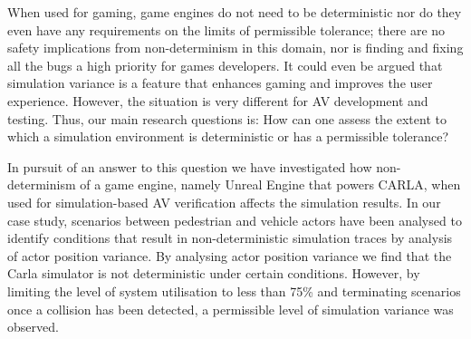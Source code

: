 \documentclass[letterpaper, 10 pt, journal, twoside]{IEEEtran}
\begin{document}

When used for gaming, game engines do not need to be deterministic nor do they even have any requirements on the limits of permissible tolerance; there are no safety implications from non-determinism in this domain, nor is finding and fixing all the bugs a high priority for games developers. It could even be argued that simulation variance is a feature that enhances gaming and improves the user experience. However, the situation is very different for AV development and testing. Thus, our main research questions is:
How can one assess the extent to which a simulation environment is deterministic or has a permissible tolerance?

In pursuit of an answer to this question we have investigated how non-determinism of a game engine, namely Unreal Engine that powers CARLA, when used for simulation-based AV verification affects the simulation results. 
%
In our case study, scenarios between pedestrian and vehicle actors have been analysed to identify conditions that result in non-deterministic simulation traces by analysis of actor position variance.
%
%
By analysing actor position variance we find that the Carla simulator is not deterministic under certain conditions. However, by limiting the level of system utilisation to less than 75\% and terminating scenarios once a collision has been detected, a permissible level of simulation variance was observed.
%
\end{document}
